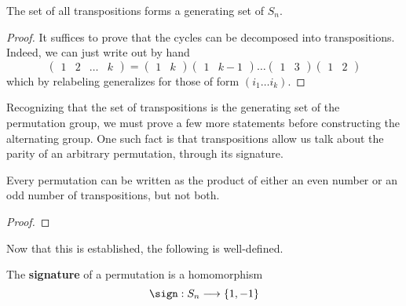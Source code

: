   \begin{corollary}
    The set of all transpositions forms a generating set of $S_{n}$. 
  \end{corollary}
  \begin{proof}
    It suffices to prove that the cycles can be decomposed into transpositions. Indeed, we can just write out by hand 
    \begin{equation}
      \begin{pmatrix} 1 & 2 & \ldots & k \end{pmatrix} = \begin{pmatrix} 1 & k \end{pmatrix} \begin{pmatrix} 1 & k-1 \end{pmatrix} \ldots \begin{pmatrix} 1 & 3 \end{pmatrix} \begin{pmatrix} 1 & 2 \end{pmatrix}
    \end{equation}
    which by relabeling generalizes for those of form $(i_1 \ldots i_k)$. 
  \end{proof}

  Recognizing that the set of transpositions is the generating set of the permutation group, we must prove a few more statements before constructing the alternating group. One such fact is that transpositions allow us talk about the parity of an arbitrary permutation, through its signature. 

  \begin{lemma}
    Every permutation can be written as the product of either an even number or an odd number of transpositions, but not both. 
  \end{lemma}
  \begin{proof}
    
  \end{proof}

  Now that this is established, the following is well-defined. 

  \begin{definition}[Signature]
    The \textbf{signature} of a permutation is a homomorphism
    \begin{equation}
      \sign : S_{n} \longrightarrow \{1, -1\}
    \end{equation}
  \end{definition}

